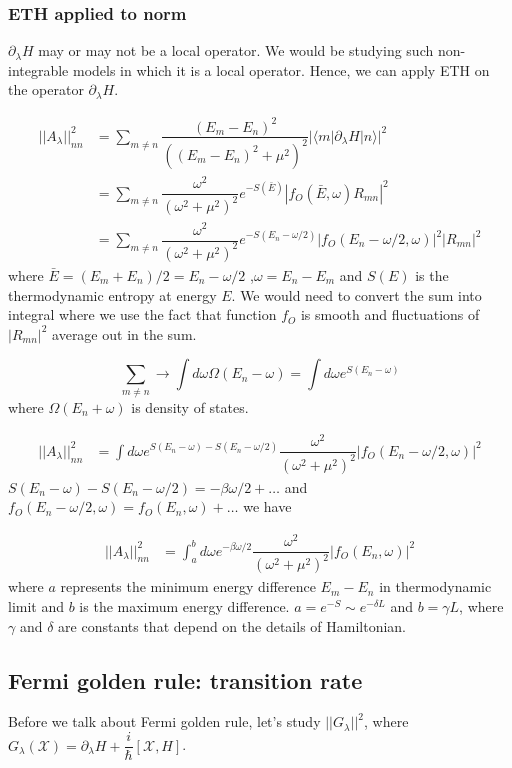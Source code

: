 \documentclass[11pt,a4paper]{article}
\begin{document}
\subsubsection{ETH applied to norm}
$\partial_{\lambda}H$ may or may not be a local operator. We would be studying such non-integrable models in which it is a local operator. Hence, we can apply ETH on the operator $\partial_{\lambda}H$.

\begin{align*}
||A_{\lambda}||^2_{nn} &= \sum_{m \neq n}  \dfrac{(E_m-E_n)^2}{((E_m-E_n)^2 + \mu^2)^2} |\langle m | \partial_{\lambda}H| n \rangle|^2\\
&=\sum_{m \neq n}  \dfrac{\omega^2}{(\omega^2 + \mu^2)^2} e^{-S(\bar{E})} |f_O(\bar{E}, \omega) R_{mn}|^2\\
&=\sum_{m \neq n}  \dfrac{\omega^2}{(\omega^2 + \mu^2)^2} e^{-S(E_n -\omega/2)} |f_O(E_n - \omega/2, \omega)|^2 |R_{mn}|^2
\end{align*}
where $\bar{E}= (E_m +E_n)/2=E_n - \omega/2$ ,$ \omega= E_n- E_m$ and $S(E)$ is the thermodynamic entropy at energy $E$.
We would need to convert the sum into integral where we use the fact that function $f_O$ is smooth and fluctuations of $|R_{mn}|^2$ average out in the sum.

\begin{equation}
\sum_{m \neq n}  \rightarrow \int d \omega \Omega(E_{n}- \omega)= \int d \omega e^{S(E_{n}- \omega)}
\end{equation}
where $\Omega(E_{n}+ \omega)$ is density of states.


\begin{align*}
||A_{\lambda}||^2_{nn} &=\int d \omega e^{S(E_{n}- \omega)-S(E_n -\omega/2)} \dfrac{\omega^2}{(\omega^2 + \mu^2)^2}  |f_O(E_n - \omega/2, \omega)|^2 
\end{align*}
$S(E_{n}- \omega)-S(E_n -\omega/2) = -\beta \omega/2 + \ldots $ and $f_O(E_n - \omega/2, \omega)=f_O(E_n, \omega) + \ldots $ we have

\begin{align*}
||A_{\lambda}||^2_{nn} &=\int_a^{b} d \omega e^{-\beta \omega/2} \dfrac{\omega^2}{(\omega^2 + \mu^2)^2}  |f_O(E_n, \omega)|^2 
\end{align*}
where $a$ represents the minimum energy difference $E_m-E_n$ in thermodynamic limit and $b$ is the maximum energy difference. $a= e^{-S} \sim e^{-\delta L}$ and $b= \gamma L$, where $\gamma$ and $\delta$ are constants that depend on the details of Hamiltonian.

\subsection{Fermi golden rule: transition rate}
Before we talk about Fermi golden rule, let's study  $||   G_{\lambda}||^2$, where $G_{\lambda}(\mathcal{X} )= \partial_{\lambda} H + \dfrac{i}{\hbar} [\mathcal{X}, H] $.
\end{document}
